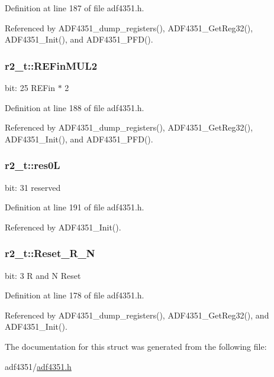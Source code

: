 Definition at line 187 of file adf4351.\+h.



Referenced by A\+D\+F4351\+\_\+dump\+\_\+registers(), A\+D\+F4351\+\_\+\+Get\+Reg32(), A\+D\+F4351\+\_\+\+Init(), and A\+D\+F4351\+\_\+\+P\+F\+D().

\subsubsection[{\texorpdfstring{R\+E\+Fin\+M\+U\+L2}{REFinMUL2}}]{ r2\+\_\+t\+::\+R\+E\+Fin\+M\+U\+L2}\hypertarget{structr2__t_aa675f6a674217e14be9e3e1754530a78}{}\label{structr2__t_aa675f6a674217e14be9e3e1754530a78}
bit\+: 25 R\+E\+Fin $\ast$ 2 

Definition at line 188 of file adf4351.\+h.



Referenced by A\+D\+F4351\+\_\+dump\+\_\+registers(), A\+D\+F4351\+\_\+\+Get\+Reg32(), A\+D\+F4351\+\_\+\+Init(), and A\+D\+F4351\+\_\+\+P\+F\+D().

\subsubsection[{\texorpdfstring{res0L}{res0L}}]{ r2\+\_\+t\+::res0L}\hypertarget{structr2__t_af67e412a4c526894fee5ce321dfce083}{}\label{structr2__t_af67e412a4c526894fee5ce321dfce083}
bit\+: 31 reserved 

Definition at line 191 of file adf4351.\+h.



Referenced by A\+D\+F4351\+\_\+\+Init().

\subsubsection[{\texorpdfstring{Reset\+\_\+\+R\+\_\+N}{Reset_R_N}}]{ r2\+\_\+t\+::\+Reset\+\_\+\+R\+\_\+N}\hypertarget{structr2__t_a21c5fab8a85d13d5e47de5588780b094}{}\label{structr2__t_a21c5fab8a85d13d5e47de5588780b094}
bit\+: 3 R and N Reset 

Definition at line 178 of file adf4351.\+h.



Referenced by A\+D\+F4351\+\_\+dump\+\_\+registers(), A\+D\+F4351\+\_\+\+Get\+Reg32(), and A\+D\+F4351\+\_\+\+Init().



The documentation for this struct was generated from the following file\+:\begin{DoxyCompactItemize}
\item 
adf4351/\hyperlink{adf4351_8h}{adf4351.\+h}\end{DoxyCompactItemize}
